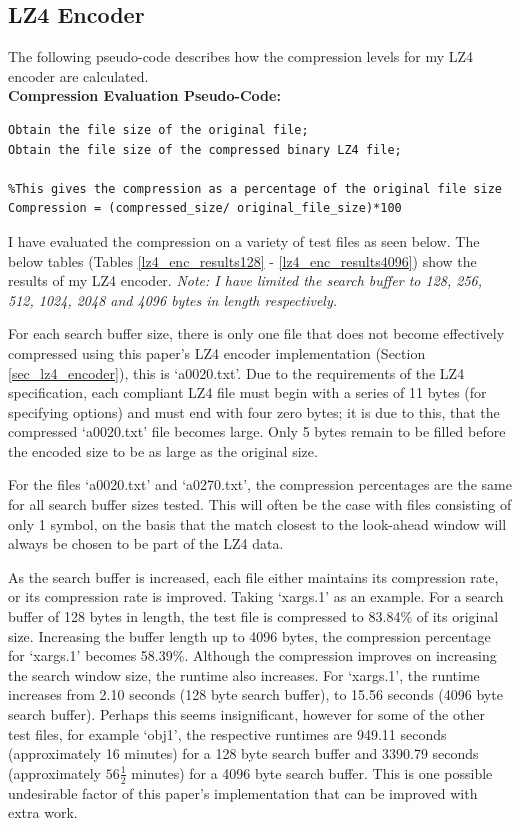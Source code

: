 \documentclass[12pt]{article}
\begin{document}
\subsection{LZ4 Encoder}
The following pseudo-code describes how the compression levels for my LZ4 encoder are calculated.
\\\textbf{Compression Evaluation Pseudo-Code:}
\begin{verbatim}
Obtain the file size of the original file;
Obtain the file size of the compressed binary LZ4 file;

%This gives the compression as a percentage of the original file size
Compression = (compressed_size/ original_file_size)*100

\end{verbatim}

I have evaluated the compression on a variety of test files as seen below. The below tables (Tables \ref{lz4_enc_results128} - \ref{lz4_enc_results4096}) show the results of my LZ4 encoder. \emph{Note: I have limited the search buffer to 128, 256, 512, 1024, 2048 and 4096 bytes in length respectively.}

For each search buffer size, there is only one file that does not become effectively compressed using this paper's LZ4 encoder implementation (Section \ref{sec_lz4_encoder}), this is `a0020.txt'. Due to the requirements of the LZ4 specification, each compliant LZ4 file must begin with a series of 11 bytes (for specifying options) and must end with four zero bytes; it is due to this, that the compressed `a0020.txt' file becomes large. Only 5 bytes remain to be filled before the encoded size to be as large as the original size.

For the files `a0020.txt' and `a0270.txt', the compression percentages are the same for all search buffer sizes tested. This will often be the case with files consisting of only 1 symbol, on the basis that the match closest to the look-ahead window will always be chosen to be part of the LZ4 data.

As the search buffer is increased, each file either maintains its compression rate, or its compression rate is improved. Taking `xargs.1' as an example. For a search buffer of 128 bytes in length, the test file is compressed to 83.84\% of its original size. Increasing the buffer length up to 4096 bytes, the compression percentage for `xargs.1' becomes 58.39\%. Although the compression improves on increasing the search window size, the runtime also increases. For `xargs.1', the runtime increases from 2.10 seconds (128 byte search buffer), to 15.56 seconds (4096 byte search buffer). Perhaps this seems insignificant, however for some of the other test files, for example `obj1', the respective runtimes are 949.11 seconds (approximately 16 minutes) for a 128 byte search buffer and 3390.79 seconds (approximately $56\frac{1}{2}$ minutes) for a 4096 byte search buffer. This is one possible undesirable factor of this paper's implementation that can be improved with extra work.
\end{document}
